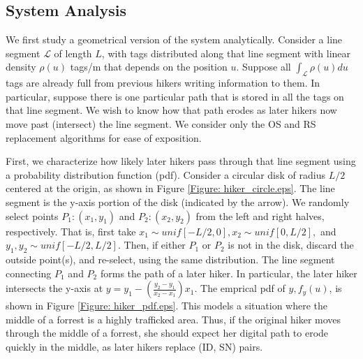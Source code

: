 \subsection{System Analysis}
We first study a geometrical version of the system analytically. Consider a line segment $\mathcal{L}$ of length $L$, with tags distributed along that line segment with linear density $\rho\left(u\right)$ tags/m that depends on the position $u$. Suppose all $\int_{\mathcal{L}} \rho\left(u\right) du $ tags are already full from previous hikers writing information to them. In particular, suppose there is one particular path that is stored in all the tags on that line segment. We wish to know how that path erodes as later hikers now move past (intersect) the line segment. We consider only the OS and RS replacement algorithms for ease of exposition.

First, we characterize how likely later hikers pass through that line segment using a probability distribution function (pdf).  Consider a circular disk of radius $L/2$ centered at the origin, as shown in Figure \ref{Figure: hiker_circle.eps}.  The line segment is the y-axis portion of the disk (indicated by the arrow).  We randomly select points $P_1: \left(x_1, y_1\right)$ and $P_2: \left(x_2, y_2\right)$ from the left and right halves, respectively. That is, first take $x_1 \sim unif\left[-L/2,0\right], x_2 \sim unif\left[0, L/2\right],$ and $y_1, y_2 \sim unif\left[-L/2, L/2\right]$. Then, if either $P_1$ or $P_2$ is not in the disk, discard the outside point(s), and re-select, using the same distribution. The line segment connecting $P_1$ and $P_2$ forms the path of a later hiker.  In particular, the later hiker intersects the y-axis at $y = y_1 - \left( \frac{y_2-y_1}{x_2-x_1}\right)x_1$.  The emprical pdf of $y, f_y\left(u\right)$, is shown in Figure \ref{Figure: hiker_pdf.eps}.  This models a situation where the middle of a forrest is a highly trafficked area.  Thus, if the original hiker moves through the middle of a forrest, she should expect her digital path to erode quickly in the middle, as later hikers replace (ID, SN) pairs.

